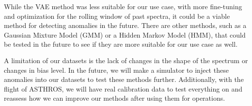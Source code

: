 While the VAE method was less suitable for our use case, with more fine-tuning and optimization for the rolling window of past spectra, it could be a viable method for detecting anomalies in the future.
There are other methods, such as a Gaussian Mixture Model (GMM) or a Hidden Markov Model (HMM), that could be tested in the future to see if they are more suitable for our use case as well.

A limitation of our datasets is the lack of changes in the shape of the spectrum or changes in bias level. 
In the future, we will make a simulator to inject these anomalies into our datasets to test these methods further. 
Additionally, with the flight of ASTHROS, we will have real calibration data to test everything on and reassess how we can improve our methods after using them for operations.